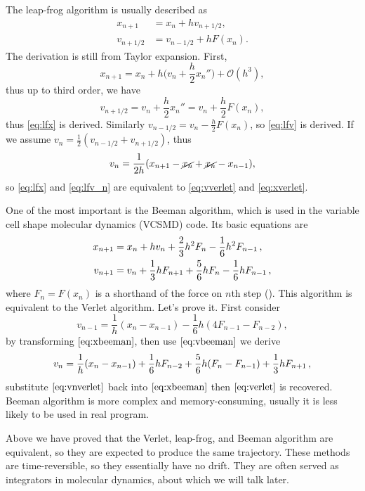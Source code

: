 The leap-frog algorithm is usually described as
\begin{subequations}
	\begin{align}
		x_{n+1}   & = x_n + h v_{n+1/2}, \label{eq:lfx}   \\
		v_{n+1/2} & = v_{n-1/2} + h F(x_n).\label{eq:lfv}
	\end{align}
\end{subequations}
The derivation is still from Taylor expansion. First,
\begin{equation}
	x_{n+1} = x_{n} + h \bigg(v_n + \frac{ h }{ 2 } x_n'' \bigg) + \mathcal{O}(h^3),
\end{equation}
thus up to third order, we have
\begin{equation}
	v_{n + 1/2} = v_n + \frac{ h }{ 2 } x_n'' = v_n + \frac{ h }{ 2 } F(x_n),
\end{equation}
thus \eqref{eq:lfx} is derived.
Similarly $v_{n-1/2} = v_n - \frac{ h }{ 2 } F(x_n)$, so \eqref{eq:lfv} is derived.
If we assume $v_n = \frac{ 1 }{ 2 }(v_{n-1/2} + v_{n+1/2})$, thus
\begin{equation}\label{eq:lfv_n}
	v_n = \frac{ 1 }{ 2h }(x_{n+1} - \cancel{x_n} + \cancel{x_n} - x_{n-1}),
\end{equation}
so \eqref{eq:lfx} and \eqref{eq:lfv_n} are equivalent to \eqref{eq:vverlet} and \eqref{eq:xverlet}.

One of the most important is the Beeman algorithm, which is used in the
variable cell shape molecular dynamics (VCSMD) code.
Its basic equations are
\begin{subequations}\label{eq:beeman}
	\begin{align}
		x_{n+1} & = x_n + h v_n + \frac{ 2 }{ 3 } h^2 F_n - \frac{ 1 }{ 6 } h^2 F_{n-1} \thinspace,
		\label{eq:xbeeman}\\
		v_{n+1} & = v_n + \frac{ 1 }{ 3 }h F_{n+1} + \frac{ 5 }{ 6 } h F_n - \frac{ 1 }{ 6 } h F_{n-1}
		\thinspace,
		\label{eq:vbeeman}
	\end{align}
\end{subequations}
where $F_n = F(x_n)$ is a shorthand of the force on $n$th step (\cite{dufty1986molecular}). This algorithm
is equivalent to the Verlet algorithm. Let's prove it. First consider
\begin{equation}
	v_{n-1} = \frac{ 1 }{ h }(x_n - x_{n-1}) - \frac{ 1 }{ 6 } h (4 F_{n-1} - F_{n-2}),
\end{equation}
by transforming $\eqref{eq:xbeeman}$, then use $\eqref{eq:vbeeman}$ we derive
\begin{equation}\label{eq:vnverlet}
	v_n = \frac{ 1 }{ h }(x_n - x_{n-1}) + \frac{ 1 }{ 6 } h F_{n-2} + \frac{ 5 }{ 6 } h (F_n - F_{n-1})
	+ \frac{ 1 }{ 3 }h F_{n+1} \thinspace,
\end{equation}
substitute $\eqref{eq:vnverlet}$ back into $\eqref{eq:xbeeman}$ then $\eqref{eq:verlet}$ is recovered.
Beeman algorithm is more complex and memory-consuming, usually it is less likely to be used in
real program.

Above we have proved that the Verlet, leap-frog, and Beeman algorithm are equivalent,
so they are expected to produce the same trajectory.
These methods are time-reversible, so they essentially have no drift. They are often
served as integrators in molecular dynamics, about which we will talk later.